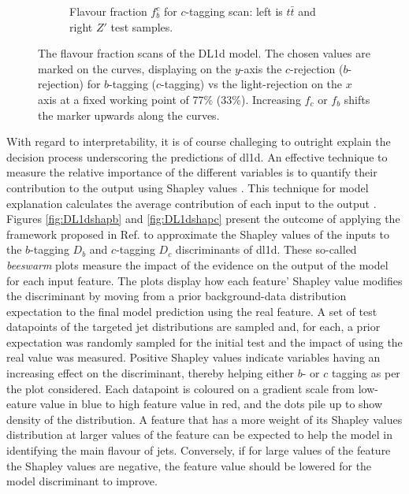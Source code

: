 \begin{figure}[h!]
\begin{subfigure}[b]{\textwidth}
    \caption{Flavour fraction $f_b^c$ for $c$-tagging scan: left is $t\bar{t}$ and right $Z'$ test samples.} 
    \label{fig:DL1dscanfc}
\end{subfigure}
  \caption{The flavour fraction scans of the DL1d model. The chosen values are marked on the curves, displaying on the $y$-axis the $c$-rejection ($b$-rejection) for $b$-tagging ($c$-tagging) vs the light-rejection on the $x$ axis at a fixed working point of 77\% (33\%). Increasing $f_c$ or $f_b$ shifts the marker upwards along the curves. }
  \label{fig:DL1dscanf}
\end{figure} 

With regard to interpretability, it is of course challeging to outright explain the decision process underscoring the predictions of \gls{dl1d}. An effective technique to measure the relative importance of the different variables is to quantify their contribution to the output using Shapley values \cite{Rozemberczki2022TheSV}. This technique for model explanation calculates the average contribution of each input to the output \cite{Rozemberczki2022TheSV}. Figures \ref{fig:DL1dshapb} and \ref{fig:DL1dshapc} present the outcome of applying the framework proposed in Ref. \cite{NIPS2017_7062} to approximate the Shapley values of the inputs to the $b$-tagging $D_b$ and $c$-tagging $D_c$ discriminants of \gls{dl1d}. These so-called \textit{beeswarm} plots measure the impact of the evidence on the output of the model for each input feature. The plots display how each feature' Shapley value modifies the discriminant by moving from a prior background-data distribution expectation to the final model prediction using the real feature. A set of test datapoints of the targeted jet distributions are sampled and, for each, a prior expectation was randomly sampled for the initial test and the impact of using the real value was measured. Positive Shapley values indicate variables having an increasing effect on the discriminant, thereby helping either $b$- or $c$ tagging as per the plot considered. Each datapoint is coloured on a gradient scale from low- eature value in blue to high feature value in red, and the dots pile up to show density of the distribution. A feature that has a more weight of its Shapley values distribution at larger values of the feature can be expected to help the model in identifying the main flavour of jets. Conversely, if for large values of the feature the Shapley values are negative, the feature value should be lowered for the model discriminant to improve. 

